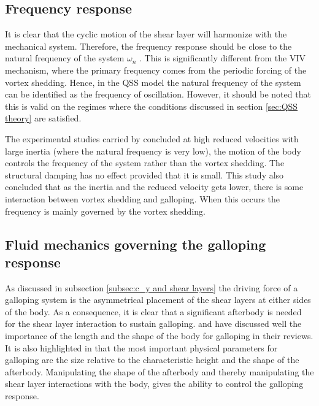 \subsection{Frequency response}
 
 It is clear that the cyclic motion of the shear layer will harmonize with the mechanical system. Therefore, the frequency response should be close to the natural frequency of the system $\omega_{n}$ \citep{Paidoussis2010}. This is significantly different from the VIV mechanism, where the primary frequency comes from the periodic forcing of the vortex shedding. Hence, in the QSS model the natural frequency of the system can be identified as the frequency of oscillation. However, it should be  noted that this is valid on the regimes where the conditions discussed in section \ref{sec:QSS theory} are satisfied. 
 
 The experimental studies carried by \citet{bouclin:77} concluded at high reduced velocities with large inertia (where the natural frequency is very low), the motion of the body controls the frequency of the system rather than the vortex shedding. The structural damping has no effect provided that it is small. This study also concluded that as the inertia and the reduced velocity gets lower, there is some interaction between vortex shedding and galloping. When this occurs the frequency is mainly governed by the vortex shedding. 
 
 \subsection{Fluid mechanics governing the galloping response}
 \label{subsec:fluid_mechanics_of_galloping}
 
 As discussed in subsection \ref{subsec:c_y and shear layers} the driving force of a galloping system is the asymmetrical placement of the shear layers at either sides of the body. As a consequence, it is clear that a significant afterbody is needed for the shear layer interaction to sustain galloping. \citet{Parkinson1974,Parkinson1989} and \citet{Bearman1987} have discussed well the importance of the length and the shape of the body for galloping in their reviews. It is also highlighted in \citet{Parkinson1974} that the most important physical parameters for galloping are the size relative to the characteristic height and the shape of the afterbody. Manipulating the shape of the afterbody and thereby manipulating the shear layer interactions with the body, gives the ability to control the galloping response.
 
